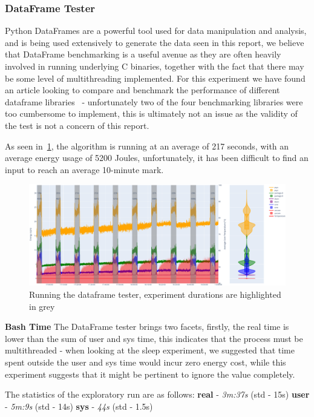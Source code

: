\subsubsection{DataFrame Tester}
Python DataFrames are a powerful tool used for data manipulation and analysis, and is being used extensively to generate
the data seen in this report, we believe that DataFrame benchmarking is a useful avenue as they are often heavily
involved in running underlying C binaries, together with the fact that there may be some level of multithreading
implemented.
For this experiment we have found an article looking to compare and benchmark the performance of different dataframe
libraries~\cite{DataframeBenchmark} - unfortunately two of the four benchmarking libraries were too cumbersome to
implement, this is ultimately not an issue as the validity of the test is not a concern of this report.

As seen in~\ref{fig:dataframe_repeating}, the algorithm is running at an average of 217 seconds, with an average energy
usage of 5200 Joules, unfortunately, it has been difficult to find an input to reach an average 10-minute mark.

\begin{figure}[H]
    \centering
    \includegraphics[width=15cm]{figures/implementation/dataframe_repetition}
    \caption{Running the dataframe tester, experiment durations are highlighted in grey}
    \label{fig:dataframe_repeating}
\end{figure}

\textbf{Bash Time}
The DataFrame tester brings two facets, firstly, the real time is lower than the sum of user and sys time, this
indicates that the process must be multithreaded - when looking at the sleep experiment, we suggested that time spent
outside the user and sys time would incur zero energy cost, while this experiment suggests that it might be
pertinent to ignore the value completely.

The statistics of the exploratory run are as follows:
\textbf{real} - \textit{3m:37s} (std - 15s)
\textbf{user} - \textit{5m:9s} (std - 14s)
\textbf{sys} - \textit{44s} (std - 1.5s)

